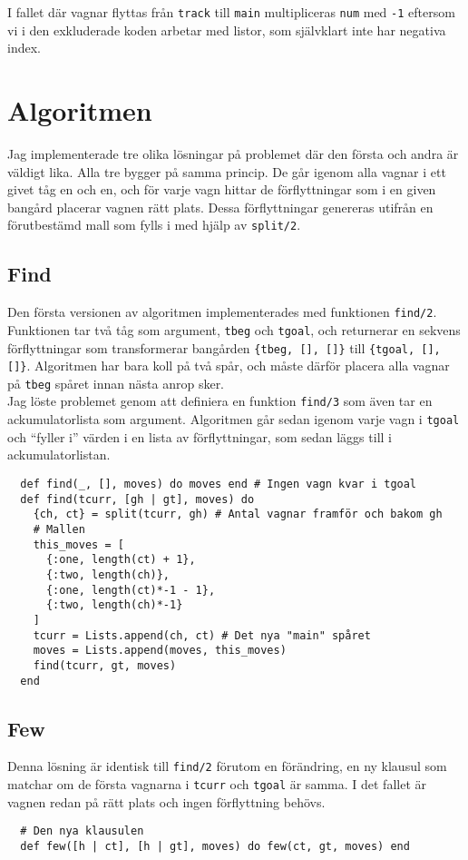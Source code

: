 \documentclass[a4paper,11pt]{article}
\begin{document}
I fallet där vagnar flyttas från {\tt track} till {\tt main} multipliceras {\tt num} med {\tt -1} eftersom vi i den exkluderade koden arbetar med listor, som självklart inte har negativa index.

\section*{Algoritmen}
Jag implementerade tre olika lösningar på problemet där den första och andra är väldigt lika. Alla tre bygger på samma princip. De går igenom alla vagnar i ett givet tåg en och en, och för varje vagn hittar de förflyttningar som i en given bangård placerar vagnen rätt plats. Dessa förflyttningar genereras utifrån en förutbestämd mall som fylls i med hjälp av {\tt split/2}.

\subsection*{Find}
Den första versionen av algoritmen implementerades med funktionen {\tt find/2}. Funktionen tar två tåg som argument, {\tt tbeg} och {\tt tgoal}, och returnerar en sekvens förflyttningar som transformerar bangården {\tt \{tbeg, [], []\}} till {\tt \{tgoal, [], []\}}. Algoritmen har bara koll på två spår, och måste därför placera alla vagnar på {\tt tbeg} spåret innan nästa anrop sker.\\
Jag löste problemet genom att definiera en funktion {\tt find/3} som även tar en ackumulatorlista som argument. Algoritmen går sedan igenom varje vagn i {\tt tgoal} och ``fyller i'' värden i en lista av förflyttningar, som sedan läggs till i ackumulatorlistan.

\begin{verbatim}
  def find(_, [], moves) do moves end # Ingen vagn kvar i tgoal
  def find(tcurr, [gh | gt], moves) do
    {ch, ct} = split(tcurr, gh) # Antal vagnar framför och bakom gh
    # Mallen
    this_moves = [
      {:one, length(ct) + 1},
      {:two, length(ch)},
      {:one, length(ct)*-1 - 1},
      {:two, length(ch)*-1}
    ]
    tcurr = Lists.append(ch, ct) # Det nya "main" spåret
    moves = Lists.append(moves, this_moves)
    find(tcurr, gt, moves)
  end
\end{verbatim}

\subsection*{Few}
Denna lösning är identisk till {\tt find/2} förutom en förändring, en ny klausul som matchar om de första vagnarna i {\tt tcurr} och {\tt tgoal} är samma. I det fallet är vagnen redan på rätt plats och ingen förflyttning behövs.
\begin{verbatim}
  # Den nya klausulen
  def few([h | ct], [h | gt], moves) do few(ct, gt, moves) end
\end{verbatim}
\end{document}
